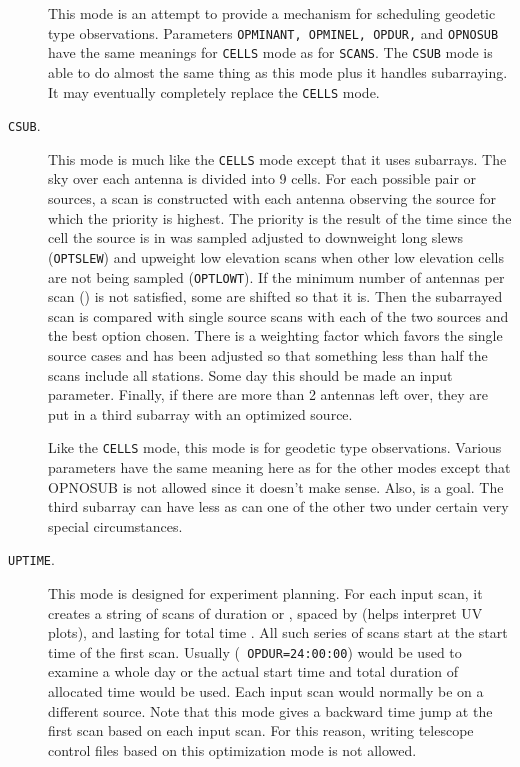 \documentclass{report}
\begin{document}
\begin{description}
This mode is an attempt to provide a mechanism for scheduling
geodetic type observations.  Parameters {\tt OPMINANT, OPMINEL,
OPDUR,} and {\tt  OPNOSUB} have the same meanings for {\tt CELLS}
mode as for {\tt SCANS}.  The {\tt CSUB} mode is able to do almost
the same thing as this mode plus it handles subarraying.  It may
eventually completely replace the {\tt CELLS} mode.

\item[{\tt CSUB}.]  This mode is much like the {\tt CELLS} mode except
that it uses subarrays.  The sky over each antenna is divided into 9
cells.  For each possible pair or sources, a scan is constructed with
each antenna observing the source for which the priority is highest.
The priority is the result of the time since the cell the source is in
was sampled adjusted to downweight long slews ({\tt OPTSLEW}) and
upweight low elevation scans when other low elevation cells are not
being sampled ({\tt OPTLOWT}).  If the minimum number of antennas per
scan () is not satisfied, some
are shifted so that it is.  Then the subarrayed scan is compared with
single source scans with each of the two sources and the best option
chosen.  There is a weighting factor which favors the single source
cases and has been adjusted so that something less than half the scans
include all stations.  Some day this should be made an input
parameter.  Finally, if there are more than 2 antennas left over, they
are put in a third subarray with an optimized source.

Like the {\tt CELLS} mode, this mode is for geodetic type
observations.  Various parameters have the same meaning here as for
the other modes except that OPNOSUB is not allowed since it doesn't
make sense.  Also,  is a goal.
The third subarray can have less as can one of the other two under
certain very special circumstances.

\item[{\tt UPTIME}.] This mode is designed for experiment planning.
For each input scan, it creates a string of scans of duration
 or , spaced
by  (helps interpret UV plots), and lasting
for total time .  All such series of
scans start at the start time of the first scan.  Usually ({\tt
OPDUR=24:00:00}) would be used to examine a whole day or the actual
start time and total duration of allocated time would be used.  Each
input scan would normally be on a different source.  Note that this
mode gives a backward time jump at the first scan based on each input
scan.  For this reason, writing telescope control files based on this
optimization mode is not allowed.


\end{description}
\end{document}
